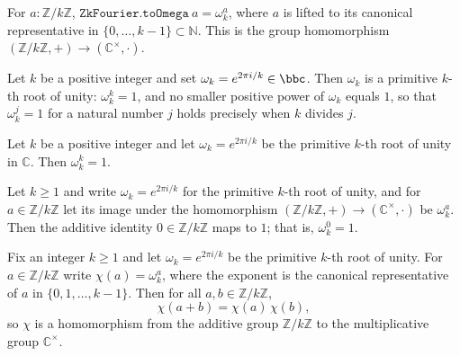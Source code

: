 \begin{definition}
\label{ZkFourier.toOmega}
\leanok
{}
For $a : \mathbb{Z}/k\mathbb{Z}$, $\texttt{ZkFourier.toOmega}\ a = \omega_k^{a}$,
where $a$ is lifted to its canonical representative in
$\{0, \ldots, k-1\} \subset \mathbb{N}$.  This is the group homomorphism
$(\mathbb{Z}/k\mathbb{Z}, +) \to (\mathbb{C}^\times, \cdot)$.
\end{definition}

\begin{lemma}
\label{ZkFourier.isPrimitiveRoot_rootOfUnity}
\leanok
{}
Let $k$ be a positive integer and set $\omega_k = e^{2\pi i / k} \in \bbc$. Then
$\omega_k$ is a primitive $k$-th root of unity: $\omega_k^k = 1$, and no smaller
positive power of $\omega_k$ equals $1$, so that $\omega_k^j = 1$ for a natural number
$j$ holds precisely when $k$ divides $j$.
\end{lemma}

\begin{lemma}
\label{ZkFourier.rootOfUnity_pow_k}
\leanok
{}
Let $k$ be a positive integer and let $\omega_k = e^{2\pi i / k}$ be the primitive
$k$-th root of unity in $\mathbb{C}$. Then $\omega_k^k = 1$.
\end{lemma}

\begin{lemma}
\label{ZkFourier.toOmega_zero}
\leanok
{}
Let $k \ge 1$ and write $\omega_k = e^{2\pi i/k}$ for the primitive $k$-th root of
unity, and for $a \in \mathbb{Z}/k\mathbb{Z}$ let its image under the homomorphism
$(\mathbb{Z}/k\mathbb{Z}, +) \to (\mathbb{C}^\times, \cdot)$ be $\omega_k^{a}$. Then the
additive identity $0 \in \mathbb{Z}/k\mathbb{Z}$ maps to $1$; that is, $\omega_k^{0} =
1$.
\end{lemma}

\begin{lemma}
\label{ZkFourier.toOmega_add}
\leanok
{}
Fix an integer $k \ge 1$ and let $\omega_k = e^{2\pi i/k}$ be the primitive $k$-th root
of unity. For $a \in \mathbb{Z}/k\mathbb{Z}$ write $\chi(a) = \omega_k^{a}$, where the
exponent is the canonical representative of $a$ in $\{0, 1, \ldots, k-1\}$. Then for all
$a, b \in \mathbb{Z}/k\mathbb{Z}$,
\[
\chi(a + b) = \chi(a)\,\chi(b),
\]
so $\chi$ is a homomorphism from the additive group $\mathbb{Z}/k\mathbb{Z}$ to the
multiplicative group $\mathbb{C}^{\times}$.
\end{lemma}

